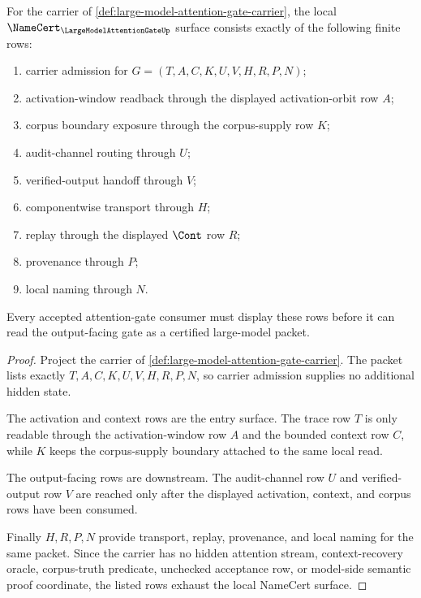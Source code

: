 \begin{theorem}
\label{thm:large-model-attention-gate-namecert-obligations}
For the carrier of \autoref{def:large-model-attention-gate-carrier}, the local $\NameCert_{\LargeModelAttentionGateUp}$ surface consists exactly of the following finite rows:
\begin{enumerate}
\item carrier admission for $G=(T,A,C,K,U,V,H,R,P,N)$;
\item activation-window readback through the displayed activation-orbit row $A$;
\item corpus boundary exposure through the corpus-supply row $K$;
\item audit-channel routing through $U$;
\item verified-output handoff through $V$;
\item componentwise transport through $H$;
\item replay through the displayed $\Cont$ row $R$;
\item provenance through $P$;
\item local naming through $N$.
\end{enumerate}
Every accepted attention-gate consumer must display these rows before it can read the output-facing gate as a certified large-model packet.
\end{theorem}
\begin{proof}
Project the carrier of \autoref{def:large-model-attention-gate-carrier}. The packet lists exactly $T,A,C,K,U,V,H,R,P,N$, so carrier admission supplies no additional hidden state.

The activation and context rows are the entry surface. The trace row $T$ is only readable through the activation-window row $A$ and the bounded context row $C$, while $K$ keeps the corpus-supply boundary attached to the same local read.

The output-facing rows are downstream. The audit-channel row $U$ and verified-output row $V$ are reached only after the displayed activation, context, and corpus rows have been consumed.

Finally $H,R,P,N$ provide transport, replay, provenance, and local naming for the same packet. Since the carrier has no hidden attention stream, context-recovery oracle, corpus-truth predicate, unchecked acceptance row, or model-side semantic proof coordinate, the listed rows exhaust the local NameCert surface.
\end{proof}

